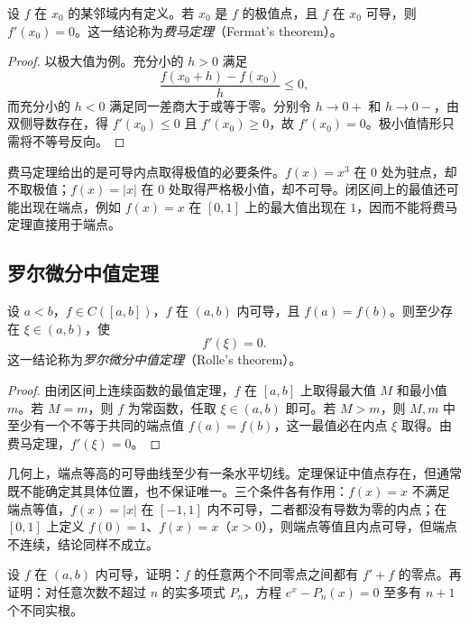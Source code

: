 \documentclass[UTF8,12pt,a4paper,fontset=fandol]{ctexbook}
\begin{document}
\begin{theorem}[费马定理]
\label{thm:fermat-stationary-point}
设 $f$ 在 $x_0$ 的某邻域内有定义。若 $x_0$ 是 $f$ 的极值点，且 $f$ 在 $x_0$ 可导，则 $f'(x_0)=0$。这一结论称为\emph{费马定理}（Fermat's theorem）。
\end{theorem}

\begin{proof}
以极大值为例。充分小的 $h>0$ 满足
\[
    \frac{f(x_0+h)-f(x_0)}h\leq0,
\]
而充分小的 $h<0$ 满足同一差商大于或等于零。分别令 $h\to0+$ 和 $h\to0-$，由双侧导数存在，得 $f'(x_0)\leq0$ 且 $f'(x_0)\geq0$，故 $f'(x_0)=0$。极小值情形只需将不等号反向。
\end{proof}

费马定理给出的是可导内点取得极值的必要条件。$f(x)=x^3$ 在 $0$ 处为驻点，却不取极值；$f(x)=|x|$ 在 $0$ 处取得严格极小值，却不可导。闭区间上的最值还可能出现在端点，例如 $f(x)=x$ 在 $[0,1]$ 上的最大值出现在 $1$，因而不能将费马定理直接用于端点。

\subsection{罗尔微分中值定理}
\label{subsec:rolle-theorem}

\begin{theorem}[罗尔微分中值定理]
\label{thm:rolle-mean-value}
设 $a<b$，$f\in C([a,b])$，$f$ 在 $(a,b)$ 内可导，且 $f(a)=f(b)$。则至少存在 $\xi\in(a,b)$，使
\[
    f'(\xi)=0.
\]
这一结论称为\emph{罗尔微分中值定理}（Rolle's theorem）。
\end{theorem}

\begin{proof}
由闭区间上连续函数的最值定理，$f$ 在 $[a,b]$ 上取得最大值 $M$ 和最小值 $m$。若 $M=m$，则 $f$ 为常函数，任取 $\xi\in(a,b)$ 即可。若 $M>m$，则 $M,m$ 中至少有一个不等于共同的端点值 $f(a)=f(b)$，这一最值必在内点 $\xi$ 取得。由费马定理，$f'(\xi)=0$。
\end{proof}

几何上，端点等高的可导曲线至少有一条水平切线。定理保证中值点存在，但通常既不能确定其具体位置，也不保证唯一。三个条件各有作用：$f(x)=x$ 不满足端点等值，$f(x)=|x|$ 在 $[-1,1]$ 内不可导，二者都没有导数为零的内点；在 $[0,1]$ 上定义 $f(0)=1$、$f(x)=x$（$x>0$），则端点等值且内点可导，但端点不连续，结论同样不成立。

\begin{example}
\label{ex:rolle-auxiliary-function-and-root-count}
设 $f$ 在 $(a,b)$ 内可导，证明：$f$ 的任意两个不同零点之间都有 $f'+f$ 的零点。再证明：对任意次数不超过 $n$ 的实多项式 $P_n$，方程 $e^x-P_n(x)=0$ 至多有 $n+1$ 个不同实根。
\end{example}
\end{document}
